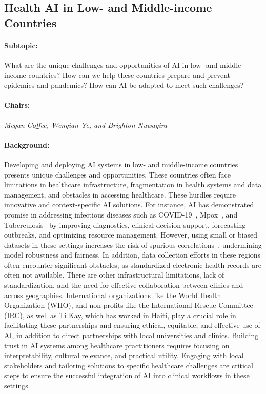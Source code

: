 \subsection{Health AI in Low- and Middle-income Countries}

\paragraph{Subtopic:} What are the unique challenges and opportunities of AI in low- and middle-income countries? How can we help these countries prepare and prevent epidemics and pandemics? How can AI be adapted to meet such challenges?\citep{mollura2020artificial}

\paragraph{Chairs:} \textit{Megan Coffee, Wenqian Ye, and Brighton Nuwagira}

\paragraph{Background:} 

Developing and deploying AI systems in low- and middle-income countries presents unique challenges and opportunities. These countries often face limitations in healthcare infrastructure, fragmentation in health systems and data management, and obstacles in accessing healthcare. These hurdles require innovative and context-specific AI solutions. For instance, AI has demonstrated promise in addressing infectious diseases such as COVID-19~\citep{jiang2020towards}, Mpox~\citep{cao2024mpoxvlm}, and Tuberculosis~\citep{ahmed2023topo} by improving diagnostics, clinical decision support, forecasting outbreaks, and optimizing resource management. However, using small or biased datasets in these settings increases the risk of spurious correlations~\citep{ye2024spurious}, undermining model robustness and fairness. In addition, data collection efforts in these regions often encounter significant obstacles, as standardized electronic health records are often not available. There are other infrastructural limitations, lack of standardization, and the need for effective collaboration between clinics and across geographies. International organizations like the World Health Organization (WHO), and non-profits like the International Rescue Committee (IRC), as well as Ti Kay, which has worked in Haiti, play a crucial role in facilitating these partnerships and ensuring ethical, equitable, and effective use of AI, in addition to direct partnerships with local universities and clinics. Building trust in AI systems among healthcare practitioners requires focusing on interpretability, cultural relevance, and practical utility. Engaging with local stakeholders and tailoring solutions to specific healthcare challenges are critical steps to ensure the successful integration of AI into clinical workflows in these settings.
 

